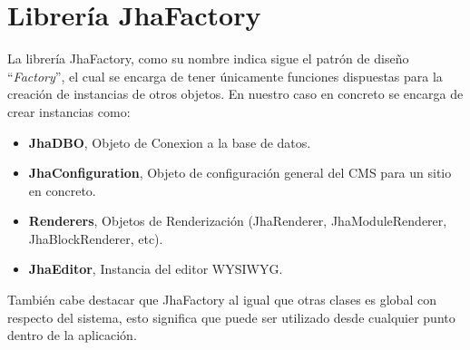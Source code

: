 \section{Librer\'ia JhaFactory}
La librer\'ia JhaFactory, como su nombre indica sigue el patr\'on de dise\~no ``\textit{Factory}'', el cual se encarga de tener \'unicamente funciones dispuestas para la creaci\'on de instancias de otros objetos. En nuestro caso en concreto se encarga de crear instancias como:
\begin{itemize}
\item \textbf{JhaDBO}, Objeto de Conexion a la base de datos.
\item \textbf{JhaConfiguration}, Objeto de configuraci\'on general del CMS para un sitio en concreto.
\item \textbf{Renderers}, Objetos de Renderizaci\'on (\textsf{JhaRenderer}, \textsf{JhaModuleRenderer}, \textsf{JhaBlockRenderer}, etc).
\item \textbf{JhaEditor}, Instancia del editor WYSIWYG.
\end{itemize}



Tambi\'en cabe destacar que JhaFactory al igual que otras clases es global con respecto del sistema, esto significa que puede ser utilizado desde cualquier punto dentro de la aplicaci\'on.

